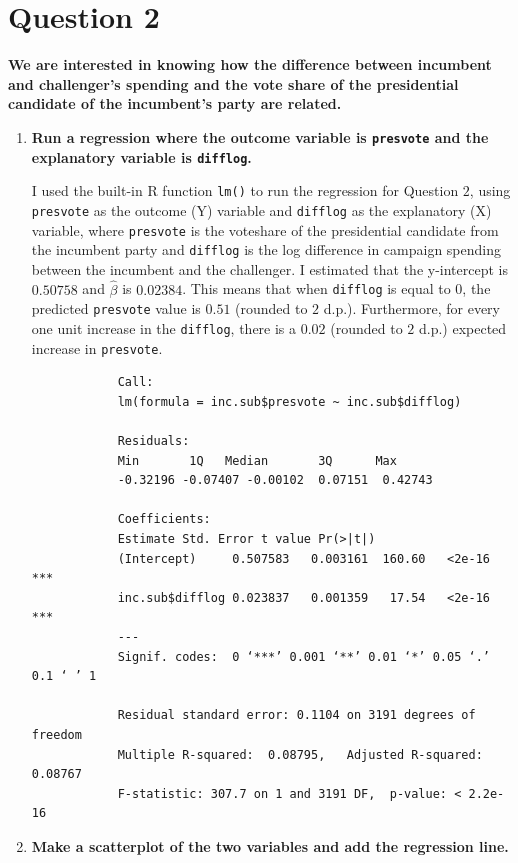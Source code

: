 \documentclass[12pt,letterpaper]{article}
\begin{document}
\section*{Question 2}
\noindent \textbf{We are interested in knowing how the difference between incumbent and challenger's spending and the vote share of the presidential candidate of the incumbent's party are related.}	\vspace{.25cm}
	\begin{enumerate}
		\item \textbf{Run a regression where the outcome variable is \texttt{presvote} and the explanatory variable is \texttt{difflog}.}	\vspace{0cm}
		
		I used the built-in R function \texttt{lm()} to run the regression for Question $2$, using \texttt{presvote} as the outcome (Y) variable and \texttt{difflog} as the explanatory (X) variable, where \texttt{presvote} is the voteshare of the presidential candidate from the incumbent party and \texttt{difflog} is the log difference in campaign spending between the incumbent and the challenger. I estimated that the y-intercept is $0.50758$ and $\hat{\beta}$ is $0.02384$. This means that when \texttt{difflog} is equal to 0, the predicted \texttt{presvote} value is $0.51$ (rounded to $2$ d.p.). Furthermore, for every one unit increase in the \texttt{difflog}, there is a $0.02$ (rounded to $2$ d.p.) expected increase in \texttt{presvote}.
		
		  
		
		\begin{verbatim}
			Call:
			lm(formula = inc.sub$presvote ~ inc.sub$difflog)
			
			Residuals:
			Min       1Q   Median       3Q      Max 
			-0.32196 -0.07407 -0.00102  0.07151  0.42743 
			
			Coefficients:
			Estimate Std. Error t value Pr(>|t|)    
			(Intercept)     0.507583   0.003161  160.60   <2e-16 ***
			inc.sub$difflog 0.023837   0.001359   17.54   <2e-16 ***
			---
			Signif. codes:  0 ‘***’ 0.001 ‘**’ 0.01 ‘*’ 0.05 ‘.’ 0.1 ‘ ’ 1
			
			Residual standard error: 0.1104 on 3191 degrees of freedom
			Multiple R-squared:  0.08795,	Adjusted R-squared:  0.08767 
			F-statistic: 307.7 on 1 and 3191 DF,  p-value: < 2.2e-16
		\end{verbatim}
		
		\item \textbf{Make a scatterplot of the two variables and add the regression line.} 	\vspace{0cm}
		

\end{enumerate}
\end{document}

